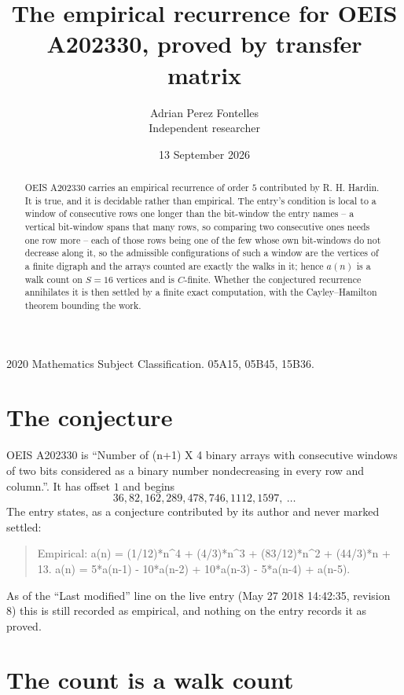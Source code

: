 \documentclass[11pt,a4paper]{article}
\title{The empirical recurrence for OEIS A202330, proved by transfer matrix}
\author{Adrian Perez Fontelles\\ \small Independent researcher}
\date{13 September 2026}
\theoremstyle{plain}
\theoremstyle{definition}
\begin{document}
\maketitle

\begin{abstract}
OEIS A202330 carries an empirical recurrence of order $5$ contributed by R. H. Hardin. It is
true, and it is decidable rather than empirical. The entry's condition is local to a window of consecutive rows one longer than the bit-window the entry names -- a vertical bit-window spans that many rows, so comparing two consecutive ones needs one row more -- each of those rows being one of the few whose own bit-windows do not decrease along it, so
the admissible configurations of such a window are the vertices of a finite digraph and the
arrays counted are exactly the walks in it; hence $a(n)$ is a walk count on $S=16$ vertices
and is $C$-finite. Whether the conjectured recurrence annihilates it is then settled by a
finite exact computation, with the Cayley--Hamilton theorem bounding the work.
\end{abstract}

\noindent\small 2020 Mathematics Subject Classification. 05A15, 05B45, 15B36.\normalsize

\section{The conjecture}

OEIS A202330 is ``Number of (n+1) X 4 binary arrays with consecutive windows of two bits considered as a binary number nondecreasing in every row and column.''. It has offset $1$ and begins
\[
36, 82, 162, 289, 478, 746, 1112, 1597,\ \dots
\]
The entry states, as a conjecture contributed by its author and never marked settled:
\begin{quote}
Empirical: a(n) = (1/12)*n\^{}4 + (4/3)*n\^{}3 + (83/12)*n\^{}2 + (44/3)*n + 13. a(n) = 5*a(n-1) - 10*a(n-2) + 10*a(n-3) - 5*a(n-4) + a(n-5).
\end{quote}
As of the ``Last modified'' line on the live entry (May 27 2018 14:42:35, revision 8) this is still
recorded as empirical, and nothing on the entry records it as proved.

\section{The count is a walk count}
\end{document}
